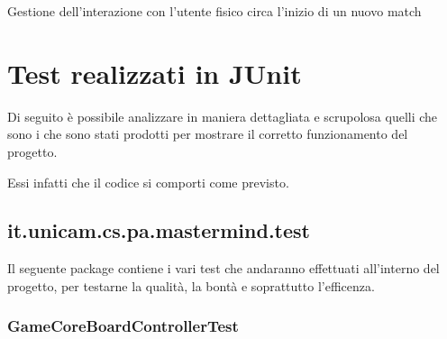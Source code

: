 \documentclass[letterpaper,10pt,italian,openany,oneside]{sphinxmanual}
\begin{document}
\begin{fulllineitems}
\label{\detokenize{source/it/unicam/cs/pa/mastermind/ui/StartView:it.unicam.cs.pa.mastermind.ui.StartView.showNewMatchStarting()}}
Gestione dell’interazione con l’utente fisico circa l’inizio di un nuovo match

\end{fulllineitems}



\chapter{Test realizzati in JUnit}
\label{\detokenize{test/packages:test-realizzati-in-junit}}\label{\detokenize{test/packages::doc}}
Di seguito è possibile analizzare in maniera dettagliata e scrupolosa quelli che sono
i  che sono stati prodotti per mostrare il corretto funzionamento del progetto.

Essi infatti  che il codice si comporti come previsto.


\section{it.unicam.cs.pa.mastermind.test}
\label{\detokenize{test/it/unicam/cs/pa/mastermind/test/package-index:it-unicam-cs-pa-mastermind-test}}\label{\detokenize{test/it/unicam/cs/pa/mastermind/test/package-index::doc}}
Il seguente package contiene i vari test che andaranno effettuati all’interno del progetto, per testarne la qualità, la bontà e soprattutto l’efficenza.

\label{\detokenize{test/it/unicam/cs/pa/mastermind/test/package-index:package-it.unicam.cs.pa.mastermind.test}}

\subsection{GameCoreBoardControllerTest}
\label{\detokenize{test/it/unicam/cs/pa/mastermind/test/GameCoreBoardControllerTest:gamecoreboardcontrollertest}}\label{\detokenize{test/it/unicam/cs/pa/mastermind/test/GameCoreBoardControllerTest::doc}}
\end{document}
